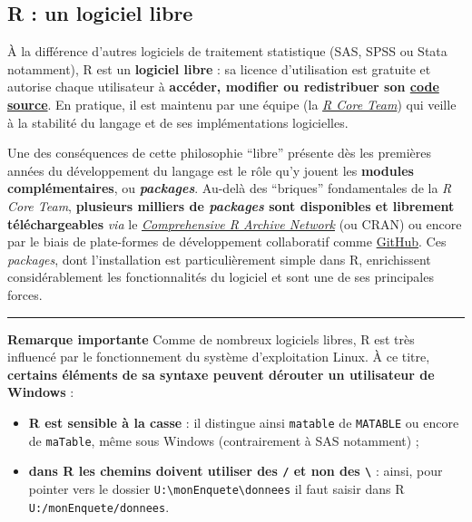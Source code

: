 \documentclass[12pt,twosided, notitlepage]{book}
\providecommand{\tightlist}{%
  \setlength{\itemsep}{0pt}\setlength{\parskip}{0pt}}
\begin{document}
\subsection{R : un logiciel libre}\label{r-un-logiciel-libre}

À la différence d'autres logiciels de traitement statistique (SAS, SPSS
ou Stata notamment), R est un \textbf{logiciel libre} : sa licence
d'utilisation est gratuite et autorise chaque utilisateur à
\textbf{accéder, modifier ou redistribuer son
\href{https://github.com/wch/r-source}{code source}}. En pratique, il
est maintenu par une équipe (la
\emph{\href{https://www.r-project.org/contributors.html}{R Core Team}})
qui veille à la stabilité du langage et de ses implémentations
logicielles.

Une des conséquences de cette philosophie \enquote{libre} présente dès
les premières années du développement du langage est le rôle qu'y jouent
les \textbf{modules complémentaires}, ou \textbf{\emph{packages}}.
Au-delà des \enquote{briques} fondamentales de la \emph{R Core Team},
\textbf{plusieurs milliers de \emph{packages} sont disponibles et
librement téléchargeables} \emph{via} le
\href{https://cran.r-project.org/}{\emph{Comprehensive R Archive
Network}} (ou CRAN) ou encore par le biais de plate-formes de
développement collaboratif comme \href{https://github.com/}{GitHub}. Ces
\emph{packages}, dont l'installation est particulièrement simple dans R,
enrichissent considérablement les fonctionnalités du logiciel et sont
une de ses principales forces.

\begin{center}\rule{0.5\linewidth}{\linethickness}\end{center}

\textbf{Remarque importante} Comme de nombreux logiciels libres, R est
très influencé par le fonctionnement du système d'exploitation Linux. À
ce titre, \textbf{certains éléments de sa syntaxe peuvent dérouter un
utilisateur de Windows} :

\begin{itemize}
\tightlist
\item
  \textbf{R est sensible à la casse} : il distingue ainsi
  \texttt{matable} de \texttt{MATABLE} ou encore de \texttt{maTable},
  même sous Windows (contrairement à SAS notamment) ;
\item
  \textbf{dans R les chemins doivent utiliser des \texttt{/} et non des
  \texttt{\textbackslash{}}} : ainsi, pour pointer vers le dossier
  \texttt{U:\textbackslash{}monEnquete\textbackslash{}donnees} il faut
  saisir dans R \texttt{U:/monEnquete/donnees}.
\end{itemize}
\end{document}

